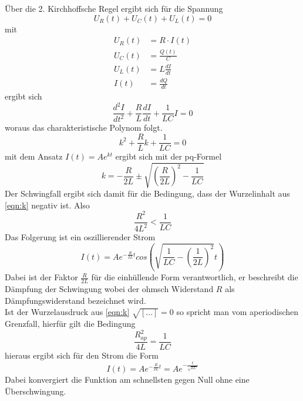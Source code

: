 Über die 2. Kirchhoffsche Regel ergibt sich für die Spannung
\begin{equation}
    U_R(t)+U_C(t)+U_L(t)=0
\end{equation}
mit
\begin{align*}
    U_R(t)&=R \cdot I(t)\\
    U_C(t)&=\frac{Q(t)}{C}\\
    U_L(t)&=L\frac{dI}{dt}\\
    I(t)&=\frac{dQ}{dt}
\end{align*}
ergibt sich
\begin{equation}
    \frac{d^2I}{dt^2}+\frac{R}{L}\frac{dI}{dt}+\frac{1}{LC}I=0
\end{equation}
woraus das charakteristische Polynom folgt.
\begin{equation}
    k^2+\frac{R}{L}k+\frac{1}{LC}=0
\end{equation}
mit dem Ansatz $I(t)=Ae^{kt}$ ergibt sich mit der pq-Formel
\begin{equation}
    k=-\frac{R}{2L} \pm \sqrt{(\frac{R}{2L})^2-\frac{1}{LC}}                          %
\end{equation}
\label{eqn:k}
Der Schwingfall ergibt sich damit für die Bedingung, dass der Wurzelinhalt 
aus \eqref{eqn:k} negativ ist. Also
\begin{equation}
    \frac{R^2}{4L^2}<\frac{1}{LC}
\end{equation}
Das Folgerung ist ein oszillierender Strom
\begin{equation}
    I(t)=Ae^{-\frac{R}{2L}t}cos(\sqrt{\frac{1}{LC}-(\frac{1}{2L})^2}t)
\end{equation} 
Dabei ist der Faktor $\frac{R}{2L}$ für die einhüllende Form verantwortlich,
er beschreibt die Dämpfung der Schwingung wobei der ohmsch Widerstand $R$ als 
Dämpfungswiderstand bezeichnet wird.\\

Ist der Wurzelausdruck aus \eqref{eqn:k} $\sqrt{[...]}=0$
so spricht man vom aperiodischen Grenzfall, hierfür gilt die Bedingung
\begin{equation}
    \frac{R_{ap}^2}{4L}=\frac{1}{LC}
\end{equation}
hieraus ergibt sich für den Strom die Form
\begin{equation}
    I(t)=Ae^{-\frac{R}{2L}t}=Ae^{-\frac{t}{\sqrt{LC}}}
\end{equation}
Dabei konvergiert die Funktion am schnellsten gegen Null ohne eine Überschwingung.\\\\


